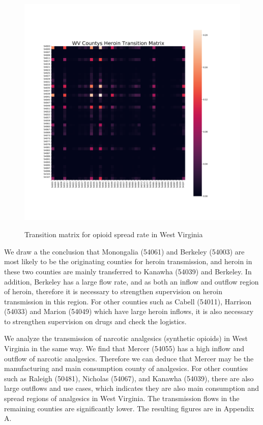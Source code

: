 \documentclass[13pt]{ctexart}
\begin{document}
\begin {figure}[h]
	\centering %
	\includegraphics[width=15cm,height=12cm]{3.png}
	\caption{Transition matrix for opioid spread rate in West Virginia} %
	\label{WV}
\end {figure}

We draw a the conclusion that Monongalia (54061) and Berkeley (54003) are most likely to be the originating counties for heroin transmission, and heroin in these two counties are mainly transferred to Kanawha (54039) and Berkeley. In addition, Berkeley has a large flow rate, and as both an inflow and outflow  region of heroin, therefore it is necessary to strengthen supervision on heroin transmission in this region. For other counties such as Cabell (54011), Harrison (54033) and Marion (54049) which have large heroin inflows, it is also necessary to strengthen supervision on drugs and check the logistics.

We analyze the transmission of narcotic analgesics (synthetic opioids) in West Virginia in the same way. We find that Mercer (54055) has a high inflow and outflow of narcotic analgesics. Therefore we can deduce that Mercer may be the manufacturing and main consumption county of analgesics. For other counties such as Raleigh (50481), Nicholas (54067), and Kanawha (54039), there are also large outflows and use cases, which indicates they are also main consumption and spread regions of analgesics in West Virginia. The transmission flows in the remaining counties are significantly lower. The resulting figures are in Appendix A.
\end{document}
